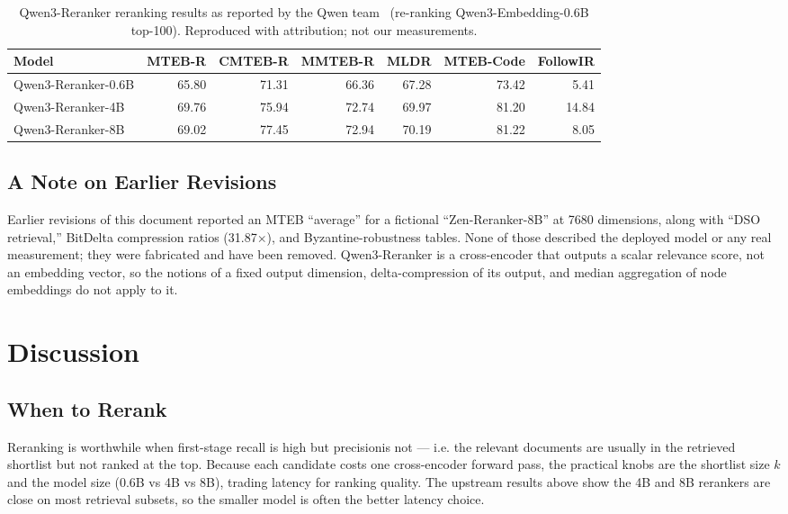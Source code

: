 \documentclass[11pt,letterpaper]{article}
\begin{document}
\begin{table}[h]
\centering
\begin{tabular}{lrrrrrr}
\toprule
\textbf{Model} & \textbf{MTEB-R} & \textbf{CMTEB-R} & \textbf{MMTEB-R} & \textbf{MLDR} & \textbf{MTEB-Code} & \textbf{FollowIR} \\
\midrule
Qwen3-Reranker-0.6B & 65.80 & 71.31 & 66.36 & 67.28 & 73.42 & 5.41 \\
Qwen3-Reranker-4B   & 69.76 & 75.94 & 72.74 & 69.97 & 81.20 & 14.84 \\
Qwen3-Reranker-8B   & 69.02 & 77.45 & 72.94 & 70.19 & 81.22 & 8.05 \\
\bottomrule
\end{tabular}
\caption{Qwen3-Reranker reranking results as reported by the Qwen team~\cite{qwen3embedding}
(re-ranking Qwen3-Embedding-0.6B top-100). Reproduced with attribution; not our measurements.}
\end{table}

\subsection{A Note on Earlier Revisions}

Earlier revisions of this document reported an MTEB ``average'' for a fictional
``Zen-Reranker-8B'' at 7680 dimensions, along with ``DSO retrieval,'' BitDelta compression
ratios (31.87$\times$), and Byzantine-robustness tables. None of those described the deployed
model or any real measurement; they were fabricated and have been removed. Qwen3-Reranker is
a cross-encoder that outputs a scalar relevance score, not an embedding vector, so the
notions of a fixed output dimension, delta-compression of its output, and median aggregation
of node embeddings do not apply to it.

\section{Discussion}

\subsection{When to Rerank}

Reranking is worthwhile when first-stage recall is high but precision\@k is not --- i.e. the
relevant documents are usually in the retrieved shortlist but not ranked at the top. Because
each candidate costs one cross-encoder forward pass, the practical knobs are the shortlist
size $k$ and the model size (0.6B vs 4B vs 8B), trading latency for ranking quality. The
upstream results above show the 4B and 8B rerankers are close on most retrieval subsets, so
the smaller model is often the better latency choice.
\end{document}
